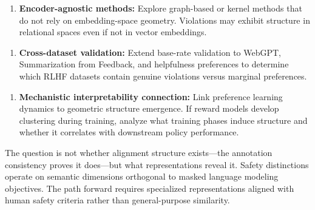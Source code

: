 \begin{enumerate}
\item \textbf{Encoder-agnostic methods:} Explore graph-based or kernel methods that do not rely on embedding-space geometry. Violations may exhibit structure in relational spaces even if not in vector embeddings.
\end{enumerate}

\begin{enumerate}
\item \textbf{Cross-dataset validation:} Extend base-rate validation to WebGPT, Summarization from Feedback, and helpfulness preferences to determine which RLHF datasets contain genuine violations versus marginal preferences.
\end{enumerate}

\begin{enumerate}
\item \textbf{Mechanistic interpretability connection:} Link preference learning dynamics to geometric structure emergence. If reward models develop clustering during training, analyze what training phases induce structure and whether it correlates with downstream policy performance.
\end{enumerate}

The question is not whether alignment structure exists—the annotation consistency proves it does—but what representations reveal it. Safety distinctions operate on semantic dimensions orthogonal to masked language modeling objectives. The path forward requires specialized representations aligned with human safety criteria rather than general-purpose similarity.
